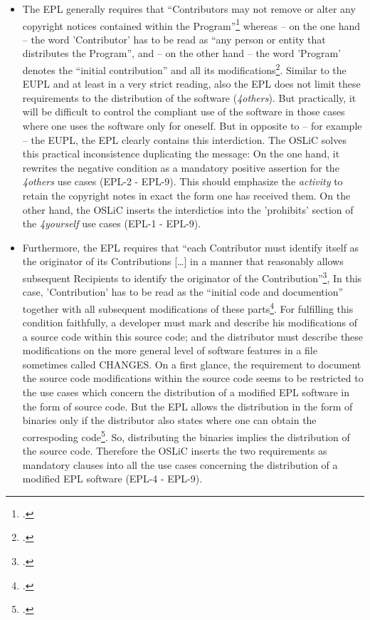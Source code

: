 \begin{itemize}

  \item The EPL generally requires that \enquote{Contributors may not remove or
  alter any copyright notices contained within the
  Program}\footcite[cf.][\nopage wp\ §3]{Epl10OsiLicense2005a} whereas -- on the
  one hand -- the word 'Contributor' has to be read as \enquote{any person or
  entity that distributes the Program}, and -- on the other hand -- the word
  'Program' denotes the \enquote{initial contribution} and all its
  modifications\footcite[cf.][\nopage wp\ §1]{Epl10OsiLicense2005a}. Similar to
  the EUPL and at least in a very strict reading, also the EPL does not limit
  these requirements to the distribution of the software (\emph{4others}). But
  practically, it will be difficult to control the compliant use of the software
  in those cases where one uses the software only for oneself. But in opposite
  to -- for example -- the EUPL, the EPL clearly contains this interdiction. The
  OSLiC solves this practical inconsistence duplicating the message: On the one
  hand, it rewrites the negative condition as a mandatory positive assertion for
  the \emph{4others} use cases (EPL-2 - EPL-9). This should emphasize the
  \emph{activity} to retain the copyright notes in exact the form one has
  received them. On the other hand, the OSLiC inserts the interdictios into the
  'prohibits' section of the \emph{4yourself} use cases (EPL-1 - EPL-9).
  
  \item Furthermore, the EPL requires that \enquote{each Contributor must
  identify itself as the originator of its Contributions [\ldots] in a manner
  that reasonably allows subsequent Recipients to identify the originator of the
  Contribution}\footcite[cf.][\nopage wp\ §3]{Epl10OsiLicense2005a}, In this
  case, 'Contribution' has to be read as the \enquote{initial code and
  documention} together with all subsequent modifications of these
  parts\footcite[cf.][\nopage wp\ §1]{Epl10OsiLicense2005a}. For fulfilling this
  condition faithfully, a developer must mark and describe his modifications of
  a source code within this source code; and the distributor must describe these
  modifications on the more general level of software features in a file
  sometimes called CHANGES. On a first glance, the requirement to document the
  source code modifications within the source code seems to be restricted to the
  use cases which concern the distribution of a modified EPL software in the
  form of source code. But the EPL allows the distribution in the form of
  binaries only if the distributor also states where one can obtain the
  correspoding code\footcite[cf.][\nopage wp\ §3]{Epl10OsiLicense2005a}. So,
  distributing the binaries implies the distribution of the source code.
  Therefore the OSLiC inserts the two requirements as mandatory clauses into all
  the use cases concerning the distribution of a modified EPL software (EPL-4 -
  EPL-9).
  

\end{itemize}
